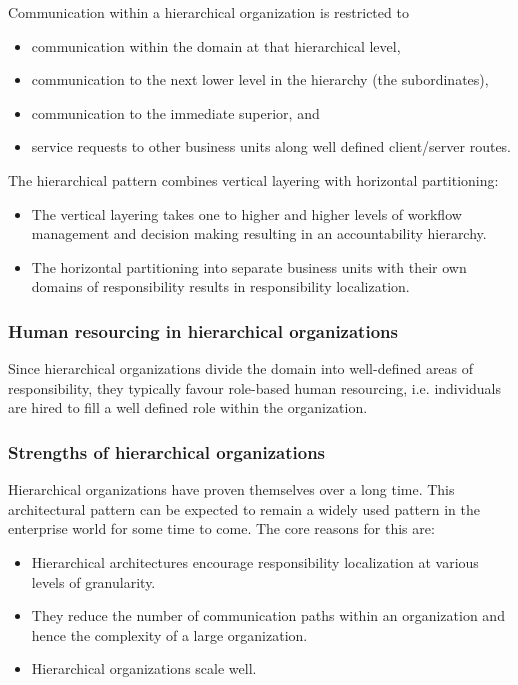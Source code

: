 \documentclass[11pt,english,a4]{article}
\begin{document}
Communication within a hierarchical organization is restricted to 
\begin{itemize}
  \item communication within the domain at that hierarchical level,
  \item communication to the next lower level in the hierarchy (the subordinates),
  \item communication to the immediate superior, and
  \item service requests to other business units along well defined client/server routes.
\end{itemize}
\noindent 
The hierarchical pattern combines vertical layering with horizontal partitioning: 
\begin{itemize}
  \item The vertical layering takes one to higher and higher levels of workflow management and decision making resulting in an accountability hierarchy.
  \item The horizontal partitioning into separate business units with their own domains of responsibility results in responsibility localization.
\end{itemize}

\subsubsection{Human resourcing in hierarchical organizations}

Since hierarchical organizations divide the domain into well-defined areas of responsibility, they typically favour role-based human resourcing, i.e. individuals are hired to fill a well defined role within the organization.

\subsubsection{Strengths of hierarchical organizations}

Hierarchical organizations have proven themselves over a long time. This architectural pattern can be expected to remain a widely used pattern in the enterprise world for some time to come. The core reasons for this are: 
\begin{itemize}
  \item Hierarchical architectures encourage responsibility localization at various levels of granularity.
  \item They reduce the number of communication paths within an organization and hence the complexity of a large organization.
  \item Hierarchical organizations scale well.
\end{itemize}
\end{document}

